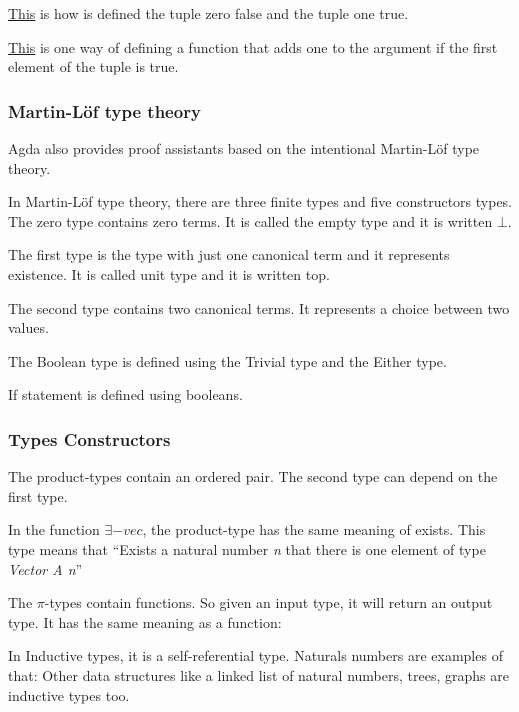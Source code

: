   \hyperref[tupleexamples]{This} is how is defined the tuple zero false and the tuple one true.

  \hyperref[tupleadd]{This} is one way of defining a function that adds one to the argument
  if the first element of the tuple is true.


  \subsubsection{Martin-Löf type theory}
  Agda also provides proof assistants based on the intentional Martin-Löf type theory.

    In Martin-Löf type theory, there are three finite types and five constructors types.
    The zero type contains zero terms. It is called the empty type and it is written $\bot$.

    The first type is the type with just one canonical term and it represents existence.
    It is called unit type and it is written top.

    The second type contains two canonical terms. It represents a choice between two values.

    The Boolean type is defined using the Trivial type and the Either type.

    If statement is defined using booleans.


    \subsubsection{Types Constructors}
    The product-types contain an ordered pair.
    The second type can depend on the first type.

    In the function $\exists-vec$, the product-type has the same meaning of exists.
    This type means that
    ``Exists a natural number \emph{n} that there is one element of type \emph{Vector A n}''

    The $\pi$-types contain functions.
    So given an input type, it will return an output type.
    It has the same meaning as a function:

    In Inductive types, it is a self-referential type.
    Naturals numbers are examples of that:
    Other data structures like a linked list of natural numbers, trees, graphs are inductive types too.

